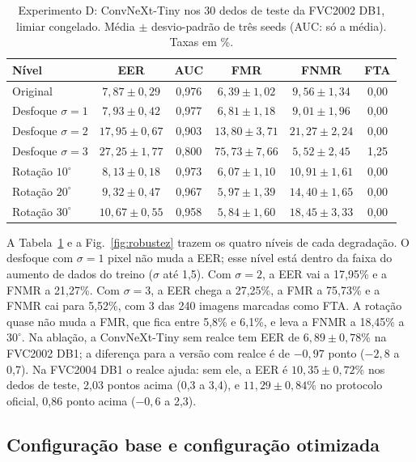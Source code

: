 \documentclass[conference]{IEEEtran}
\begin{document}
\begin{table}[t]
\centering
\caption{Experimento D: ConvNeXt-Tiny nos 30 dedos de teste da FVC2002 DB1, limiar congelado. Média $\pm$ desvio-padrão de três seeds (AUC: só a média). Taxas em \%.}
\label{tab:robustez}
\footnotesize
\setlength{\tabcolsep}{2.5pt}
\begin{tabular}{@{}lccccc@{}}
\toprule
Nível & EER & AUC & FMR & FNMR & FTA \\
\midrule
Original & $7{,}87\pm0{,}29$ & 0,976 & $6{,}39\pm1{,}02$ & $9{,}56\pm1{,}34$ & 0,00 \\
\midrule
Desfoque $\sigma=1$ & $7{,}93\pm0{,}42$ & 0,977 & $6{,}81\pm1{,}18$ & $9{,}01\pm1{,}96$ & 0,00 \\
Desfoque $\sigma=2$ & $17{,}95\pm0{,}67$ & 0,903 & $13{,}80\pm3{,}71$ & $21{,}27\pm2{,}24$ & 0,00 \\
Desfoque $\sigma=3$ & $27{,}25\pm1{,}77$ & 0,800 & $75{,}73\pm7{,}66$ & $5{,}52\pm2{,}45$ & 1,25 \\
\midrule
Rotação $10^\circ$ & $8{,}13\pm0{,}18$ & 0,973 & $6{,}07\pm1{,}10$ & $10{,}91\pm1{,}61$ & 0,00 \\
Rotação $20^\circ$ & $9{,}32\pm0{,}47$ & 0,967 & $5{,}97\pm1{,}39$ & $14{,}40\pm1{,}65$ & 0,00 \\
Rotação $30^\circ$ & $10{,}67\pm0{,}55$ & 0,958 & $5{,}84\pm1{,}60$ & $18{,}45\pm3{,}33$ & 0,00 \\
\bottomrule
\end{tabular}
\end{table}

A Tabela~\ref{tab:robustez} e a Fig.~\ref{fig:robustez} trazem os quatro níveis de cada degradação. O desfoque com $\sigma=1$ pixel não muda a EER; esse nível está dentro da faixa do aumento de dados do treino ($\sigma$ até 1,5). Com $\sigma=2$, a EER vai a 17,95\% e a FNMR a 21,27\%. Com $\sigma=3$, a EER chega a 27,25\%, a FMR a 75,73\% e a FNMR cai para 5,52\%, com 3 das 240 imagens marcadas como FTA. A rotação quase não muda a FMR, que fica entre 5,8\% e 6,1\%, e leva a FNMR a 18,45\% a $30^\circ$. Na ablação, a ConvNeXt-Tiny sem realce tem EER de $6{,}89\pm0{,}78$\% na FVC2002 DB1; a diferença para a versão com realce é de $-0{,}97$ ponto ($-2{,}8$ a 0,7). Na FVC2004 DB1 o realce ajuda: sem ele, a EER é $10{,}35\pm0{,}72$\% nos dedos de teste, 2,03 pontos acima (0,3 a 3,4), e $11{,}29\pm0{,}84$\% no protocolo oficial, 0,86 ponto acima ($-0{,}6$ a 2,3).

\subsection{Configuração base e configuração otimizada}
\end{document}
